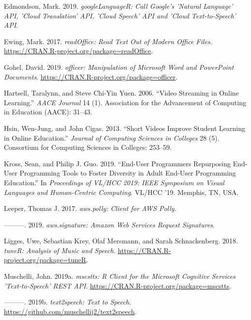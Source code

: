 \leavevmode\hypertarget{ref-googleLanguageR}{}%
Edmondson, Mark. 2019. \emph{googleLanguageR: Call Google's 'Natural
Language' API, 'Cloud Translation' API, 'Cloud Speech' API and 'Cloud
Text-to-Speech' API}.

\leavevmode\hypertarget{ref-readOffice}{}%
Ewing, Mark. 2017. \emph{readOffice: Read Text Out of Modern Office
Files}. \url{https://CRAN.R-project.org/package=readOffice}.

\leavevmode\hypertarget{ref-officer}{}%
Gohel, David. 2019. \emph{officer: Manipulation of Microsoft Word and
PowerPoint Documents}. \url{https://CRAN.R-project.org/package=officer}.

\leavevmode\hypertarget{ref-hartsell2006video}{}%
Hartsell, Taralynn, and Steve Chi-Yin Yuen. 2006. ``Video Streaming in
Online Learning.'' \emph{AACE Journal} 14 (1). Association for the
Advancement of Computing in Education (AACE): 31--43.

\leavevmode\hypertarget{ref-hsin2013short}{}%
Hsin, Wen-Jung, and John Cigas. 2013. ``Short Videos Improve Student
Learning in Online Education.'' \emph{Journal of Computing Sciences in
Colleges} 28 (5). Consortium for Computing Sciences in Colleges:
253--59.

\leavevmode\hypertarget{ref-Kross-2019}{}%
Kross, Sean, and Philip J. Guo. 2019. ``End-User Programmers Repurposing
End-User Programming Tools to Foster Diversity in Adult End-User
Programming Education.'' In \emph{Proceedings of VL/HCC 2019: IEEE
Symposium on Visual Languages and Human-Centric Computing}. VL/HCC '19.
Memphis, TN, USA.

\leavevmode\hypertarget{ref-aws.polly}{}%
Leeper, Thomas J. 2017. \emph{aws.polly: Client for AWS Polly}.

\leavevmode\hypertarget{ref-aws.signature}{}%
---------. 2019. \emph{aws.signature: Amazon Web Services Request
Signatures}.

\leavevmode\hypertarget{ref-tuneR}{}%
Ligges, Uwe, Sebastian Krey, Olaf Mersmann, and Sarah Schnackenberg.
2018. \emph{tuneR: Analysis of Music and Speech}.
\url{https://CRAN.R-project.org/package=tuneR}.

\leavevmode\hypertarget{ref-mscstts}{}%
Muschelli, John. 2019a. \emph{mscstts: R Client for the Microsoft
Cognitive Services 'Text-to-Speech' REST API}.
\url{https://CRAN.R-project.org/package=mscstts}.

\leavevmode\hypertarget{ref-text2speech}{}%
---------. 2019b. \emph{text2speech: Text to Speech}.
\url{https://github.com/muschellij2/text2speech}.

